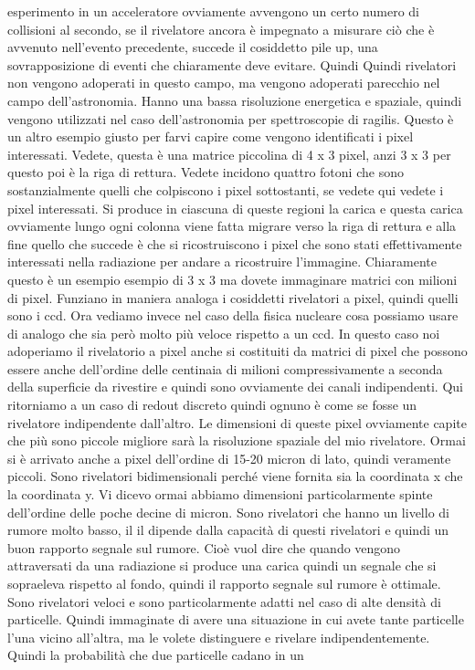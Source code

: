 esperimento in un acceleratore ovviamente avvengono un certo numero di collisioni al secondo, se il rivelatore ancora è impegnato a misurare ciò che è avvenuto nell'evento precedente, succede il cosiddetto pile up, una sovrapposizione di eventi che chiaramente deve evitare. Quindi Quindi rivelatori non vengono adoperati in questo campo, ma vengono adoperati parecchio nel campo dell'astronomia. Hanno una bassa risoluzione energetica e spaziale, quindi vengono utilizzati nel caso dell'astronomia per spettroscopie di ragilis. Questo è un altro esempio giusto per farvi capire come vengono identificati i pixel interessati. Vedete, questa è una matrice piccolina di 4 x 3 pixel, anzi 3 x 3 per questo poi è la riga di rettura. Vedete incidono quattro fotoni che sono sostanzialmente quelli che colpiscono i pixel sottostanti, se vedete qui vedete i pixel interessati. Si produce in ciascuna di queste regioni la carica e questa carica ovviamente lungo ogni colonna viene fatta migrare verso la riga di rettura e alla fine quello che succede è che si ricostruiscono i pixel che sono stati effettivamente interessati nella radiazione per andare a ricostruire l'immagine. Chiaramente questo è un esempio esempio di 3 x 3 ma dovete immaginare matrici con milioni di pixel. Funziano in maniera analoga i cosiddetti rivelatori a pixel, quindi quelli sono i ccd. Ora vediamo invece nel caso della fisica nucleare cosa possiamo usare di analogo che sia però molto più veloce rispetto a un ccd. In questo caso noi adoperiamo il rivelatorio a pixel anche si costituiti da matrici di pixel che possono essere anche dell'ordine delle centinaia di milioni compressivamente a seconda della superficie da rivestire e quindi sono ovviamente dei canali indipendenti. Qui ritorniamo a un caso di redout discreto quindi ognuno è come se fosse un rivelatore indipendente dall'altro. Le dimensioni di queste pixel ovviamente capite che più sono piccole migliore sarà la risoluzione spaziale del mio rivelatore. Ormai si è arrivato anche a pixel dell'ordine di 15-20 micron di lato, quindi veramente piccoli. Sono rivelatori bidimensionali perché viene fornita sia la coordinata x che la coordinata y. Vi dicevo ormai abbiamo dimensioni particolarmente spinte dell'ordine delle poche decine di micron. Sono rivelatori che hanno un livello di rumore molto basso, il il dipende dalla capacità di questi rivelatori e quindi un buon rapporto segnale sul rumore. Cioè vuol dire che quando vengono attraversati da una radiazione si produce una carica quindi un segnale che si sopraeleva rispetto al fondo, quindi il rapporto segnale sul rumore è ottimale. Sono rivelatori veloci e sono particolarmente adatti nel caso di alte densità di particelle. Quindi immaginate di avere una situazione in cui avete tante particelle l'una vicino all'altra, ma le volete distinguere e rivelare indipendentemente. Quindi la probabilità che due particelle cadano in un 

